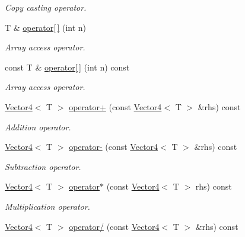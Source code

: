 \begin{DoxyCompactItemize}
\begin{DoxyCompactList}\small\item\em Copy casting operator. \item\end{DoxyCompactList}\item 
T \& \hyperlink{class_vector4_a992debdc2a8aee9ba1bcc9bb763a1270}{operator\mbox{[}$\,$\mbox{]}} (int n)
\begin{DoxyCompactList}\small\item\em Array access operator. \item\end{DoxyCompactList}\item 
const T \& \hyperlink{class_vector4_a6ae2a5a65474cb93edc7aceac761850c}{operator\mbox{[}$\,$\mbox{]}} (int n) const 
\begin{DoxyCompactList}\small\item\em Array access operator. \item\end{DoxyCompactList}\item 
\hyperlink{class_vector4}{Vector4}$<$ T $>$ \hyperlink{class_vector4_a80a688fb0462045dd222a0b565477824}{operator+} (const \hyperlink{class_vector4}{Vector4}$<$ T $>$ \&rhs) const 
\begin{DoxyCompactList}\small\item\em Addition operator. \item\end{DoxyCompactList}\item 
\hyperlink{class_vector4}{Vector4}$<$ T $>$ \hyperlink{class_vector4_a46dae2fe0b182172dbc5940ce54329a1}{operator-\/} (const \hyperlink{class_vector4}{Vector4}$<$ T $>$ \&rhs) const 
\begin{DoxyCompactList}\small\item\em Subtraction operator. \item\end{DoxyCompactList}\item 
\hyperlink{class_vector4}{Vector4}$<$ T $>$ \hyperlink{class_vector4_a86f22a427d874dc481b949ed761f9896}{operator$\ast$} (const \hyperlink{class_vector4}{Vector4}$<$ T $>$ rhs) const 
\begin{DoxyCompactList}\small\item\em Multiplication operator. \item\end{DoxyCompactList}\item 
\hyperlink{class_vector4}{Vector4}$<$ T $>$ \hyperlink{class_vector4_ae71f14523d070c119854f1df4c5ee084}{operator/} (const \hyperlink{class_vector4}{Vector4}$<$ T $>$ \&rhs) const 

\end{DoxyCompactItemize}
